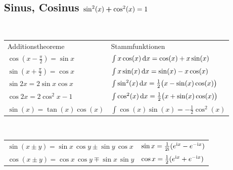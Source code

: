 \documentclass[fs, footer]{latex4ei}
\begin{document}
\begin{multicols*}{4}
{\subsection{Sinus, Cosinus \quad $\sin^2(x) \boldsymbol{+} \cos^2(x) = 1$}
\setlength{\tabcolsep}{4pt}
\\
\begin{tabular*}{\columnwidth}{@{\extracolsep\fill}ll@{}}
	Additionstheoreme &  Stammfunktionen\\
 	$\cos (x - \frac{\pi}{2}) = \sin x$ & $\int x \cos(x) \diff x = \cos(x) + x \sin(x)$\\
 	$\sin (x + \frac{\pi}{2}) = \cos x$ & $\int x \sin(x) \diff x = \sin(x) - x \cos(x)$\\
 	$\sin 2x = 2 \sin x \cos x $  & $\int \sin^2(x) \diff x = \frac12 \bigl(x - \sin(x)\cos(x) \bigr)$\\ 
 	$\cos 2x = 2\cos^2 x - 1$  & $\int \cos^2(x) \diff x = \frac12 \bigl(x + \sin(x)\cos(x) \bigr)$\\
 	$\sin(x) = \tan(x)\cos(x)$ & $\int \cos(x)\sin(x) = -\frac12 \cos^2(x)$ \\
\end{tabular*}\\[1em]
\begin{tabular*}{\columnwidth}{@{\extracolsep\fill}ll@{}}
$\sin ( x \pm y ) = \sin x \, \cos y \pm \sin y \, \cos x$ & $\sin x = \frac{1}{2 \mathrm{i}} (e^{\mathrm{i} x} - e^{- \mathrm{i} x })$\\
$\cos ( x \pm y ) = \cos x \, \cos y \mp \sin x \, \sin y$ & $\cos x = \frac{1}{2} (e^{\mathrm{i} x} + e^{- \mathrm{i} x })$\\
\end{tabular*}
}


\end{multicols*}
\end{document}
